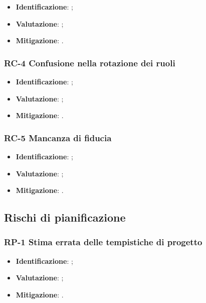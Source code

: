 \begin{itemize}
\setlength\itemsep{0em}
    \item \textbf{Identificazione}: ;
    \item \textbf{Valutazione}: ;
    \item \textbf{Mitigazione}: .
\end{itemize}

\subsubsection{RC-4 Confusione nella rotazione dei ruoli}

\begin{itemize}
\setlength\itemsep{0em}
    \item \textbf{Identificazione}: ;
    \item \textbf{Valutazione}: ;
    \item \textbf{Mitigazione}: .
\end{itemize}

\subsubsection{RC-5 Mancanza di fiducia}

\begin{itemize}
\setlength\itemsep{0em}
    \item \textbf{Identificazione}: ;
    \item \textbf{Valutazione}: ;
    \item \textbf{Mitigazione}: .
\end{itemize}

\subsection{Rischi di pianificazione}

\subsubsection{RP-1 Stima errata delle tempistiche di progetto}
\begin{itemize}
\setlength\itemsep{0em}
    \item \textbf{Identificazione}: ;
    \item \textbf{Valutazione}: ;
    \item \textbf{Mitigazione}: .
\end{itemize}

